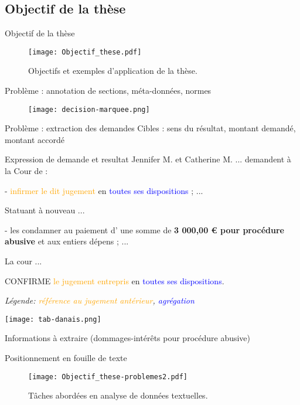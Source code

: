 \subsection{Objectif de la thèse}
\begin{frame}[c]{Objectif de la thèse}
	\begin{figure}[!htb]	
		\texttt{[image: Objectif\_these.pdf]}
		\caption{Objectifs et exemples d'application de la thèse.} \label{fig:intro:objectif-these}
	\end{figure}
\end{frame}

\begin{frame}[c]{Problème : annotation de sections, méta-données, normes}
\begin{figure}
	\texttt{[image: decision-marquee.png]}
\end{figure}
\end{frame}

\begin{frame}[c]{Problème : extraction des demandes}
	Cibles : sens du résultat, montant demandé, montant accordé
\begin{exampleblock}{Expression de demande et resultat}
\scriptsize
Jennifer M. et Catherine M. ... demandent à la Cour de :

- \textcolor{orange}{infirmer le dit jugement} en \textcolor{blue}{toutes ses dispositions} ; 
...

Statuant à nouveau ...

- les condamner au paiement d' une somme de  \textbf{3 000,00 € pour procédure abusive} et
aux entiers dépens ; ...

La cour ...  

CONFIRME \textcolor{orange}{le jugement entrepris} en \textcolor{blue}{toutes ses dispositions}.

\end{exampleblock}

\scriptsize{\textit{Légende:  \textcolor{orange}{référence au jugement antérieur},  \textcolor{blue}{agrégation}}}


\begin{table} 
\centering \texttt{[image: tab-danais.png]}
\caption{\scriptsize Informations à extraire (dommages-intérêts pour procédure abusive)}
\end{table}
\end{frame}



\begin{frame}[c]{Positionnement en fouille de texte}	
	\begin{figure}[!htb]
		\texttt{[image: Objectif\_these-problemes2.pdf]}
		\caption{Tâches abordées en analyse de données textuelles.} \label{fig:intro:objectif-these-problemes}
	\end{figure}
\end{frame}

